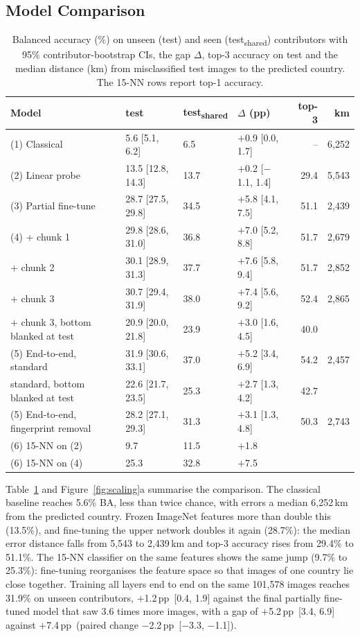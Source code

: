 \documentclass[clean,twocolumn]{bam-project}
\newcommand{\tsh}{test\textsubscript{shared}}
\newcommand{\pp}{\,pp}
\begin{document}
\subsection{Model Comparison}
\begin{table}[!t]
\centering\small
\caption{Balanced accuracy (\%) on unseen (test) and seen (\tsh) contributors with 95\%
contributor-bootstrap CIs, the gap $\Delta$, top-3 accuracy on test and the median distance (km) from
misclassified test images to the predicted country. The 15-NN rows report top-1 accuracy.}
\label{tab:main}
\setlength{\tabcolsep}{4pt}
\begin{tabular}{@{}llllrr@{}}
\toprule
Model & test & \tsh & $\Delta$ (pp) & top-3 & km \\
\midrule
(1) Classical & 5.6 [5.1, 6.2] & 6.5 & $+$0.9 [0.0, 1.7] & -- & 6{,}252 \\
(2) Linear probe & 13.5 [12.8, 14.3] & 13.7 & $+$0.2 [$-$1.1, 1.4] & 29.4 & 5{,}543 \\
(3) Partial fine-tune & 28.7 [27.5, 29.8] & 34.5 & $+$5.8 [4.1, 7.5] & 51.1 & 2{,}439 \\
(4) + chunk 1 & 29.8 [28.6, 31.0] & 36.8 & $+$7.0 [5.2, 8.8] & 51.7 & 2{,}679 \\
\phantom{(4)} + chunk 2 & 30.1 [28.9, 31.3] & 37.7 & $+$7.6 [5.8, 9.4] & 51.7 & 2{,}852 \\
\phantom{(4)} + chunk 3 & 30.7 [29.4, 31.9] & 38.0 & $+$7.4 [5.6, 9.2] & 52.4 & 2{,}865 \\
\phantom{(4)} + chunk 3, bottom blanked at test & 20.9 [20.0, 21.8] & 23.9 & $+$3.0 [1.6, 4.5] & 40.0 & \\
\midrule
(5) End-to-end, standard & 31.9 [30.6, 33.1] & 37.0 & $+$5.2 [3.4, 6.9] & 54.2 & 2{,}457 \\
\phantom{(5)} standard, bottom blanked at test & 22.6 [21.7, 23.5] & 25.3 & $+$2.7 [1.3, 4.2] & 42.7 &  \\
(5) End-to-end, fingerprint removal & 28.2 [27.1, 29.3] & 31.3 & $+$3.1 [1.3, 4.8] & 50.3 & 2{,}743 \\
\midrule
(6) 15-NN on (2) & 9.7 & 11.5 & $+$1.8 & & \\
(6) 15-NN on (4) & 25.3 & 32.8 & $+$7.5 & & \\
\bottomrule
\end{tabular}
\end{table}

Table~\ref{tab:main} and Figure~\ref{fig:scaling}a summarise the comparison. The classical baseline
reaches 5.6\% BA, less than twice chance, with errors a median 6{,}252\,km from the predicted country.
Frozen ImageNet features more than double this (13.5\%), and fine-tuning the upper network doubles it
again (28.7\%): the median error distance falls from 5{,}543 to 2{,}439\,km and top-3 accuracy rises
from 29.4\% to 51.1\%. The 15-NN classifier on the same features shows the same jump (9.7\% to 25.3\%):
fine-tuning reorganises the feature space so that images of one country lie close together.
Training all layers end to end on the same 101{,}578 images reaches 31.9\% on unseen contributors, $+$1.2\pp\ [0.4, 1.9] against the final partially fine-tuned model that saw 3.6 times more images, with a gap of $+$5.2\pp\ [3.4, 6.9] against $+$7.4\pp\ (paired change $-$2.2\pp\ [$-$3.3, $-$1.1]).
\end{document}
